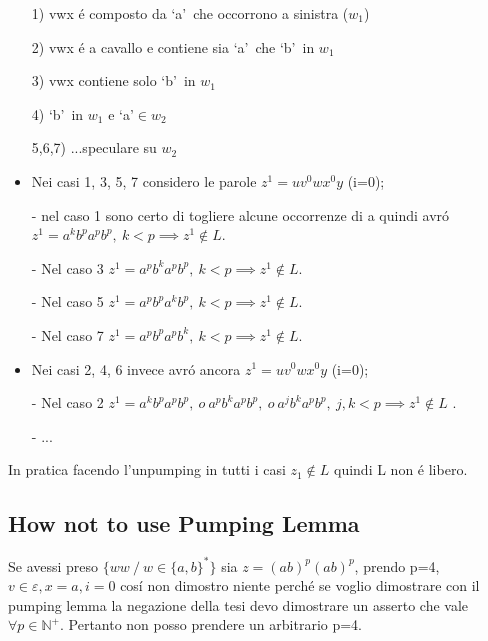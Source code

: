 \begin{itemize}
\item[1)] vwx \'e composto da \lq a\rq\ che occorrono a sinistra ($w_1$)\\
\item[2)] vwx \'e a cavallo e contiene sia \lq a\rq\ che \lq b\rq\ in $w_1$\\
\item[3)] vwx contiene solo \lq b\rq\ in $w_1$\\
\item[4)] \lq b\rq\ in $w_1$ e \lq a\rq $\in w_2$\\
\item[5,6,7)] ...speculare su $w_2$\\
\end{itemize} 
\begin{itemize}
	\item Nei casi 1, 3, 5, 7 considero le parole $z^1=uv^0wx^0y$ (i=0);\\
	\item[-] nel caso 1 sono certo di togliere alcune occorrenze di a quindi avr\'o $z^1 = a^k b^p a^p b^p,\ k < p \implies z^1 \not\in L$. \\
	\item[-] Nel caso 3 $z^1 = a^p b^k a^p b^p,\ k < p \implies z^1 \not\in L$.\\
	\item[-] Nel caso 5 $z^1 = a^p b^p a^k b^p,\ k < p \implies z^1 \not\in L$.\\
	\item[-] Nel caso 7 $z^1 = a^p b^p a^p b^k,\ k < p \implies z^1 \not\in L$.\\
	\item Nei casi 2, 4, 6 invece avr\'o ancora $ z^1=uv^0wx^0y $ (i=0);\\
	\item[-] Nel caso 2 $z^1 = a^k b^p a^p b^p,\ o\ a^p b^k a^p b^p,\ o\ a^j b^k a^p b^p,\ j,k < p \implies z^1 \not\in L$ .\\
	\item[-] ...\\
\end{itemize}
In pratica facendo l'unpumping in tutti i casi $z_1 \not\in L$ quindi L non \'e libero.

\subsection{How not to use Pumping Lemma}
Se avessi preso $\{ww \ / \ w\in\{a,b\}^*\}$ sia $z = (ab)^p (ab)^p$, prendo p=4, $v\in\varepsilon, x=a, i = 0$ cos\'i non 
dimostro niente perch\'e se voglio dimostrare con il pumping lemma la negazione della tesi devo dimostrare un asserto che vale $\forall p \in \mathbb{N}^+$.
Pertanto non posso prendere un arbitrario p=4.




